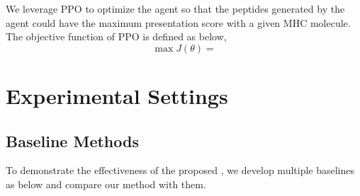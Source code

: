 \documentclass[letterpaper]{article}
\begin{document}
We leverage PPO \cite{schulman17ppo} to optimize the agent so that the peptides generated by the agent could have the 
maximum presentation score with a given MHC molecule.
%
The objective function of PPO is defined as below,
\begin{equation}
\max J(\theta) = 
\end{equation}


\section{Experimental Settings}
\label{sec:experiments}

\subsection{Baseline Methods}
\label{sec:experiments:baseline}
%
To demonstrate the effectiveness of the proposed \pepppo, we develop multiple baselines as below and compare our method with them.
\end{document}
